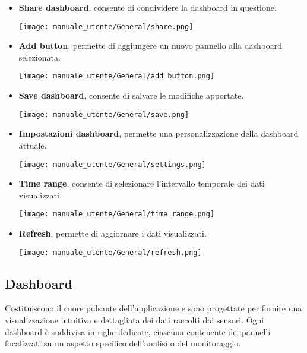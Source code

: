 \begin{itemize}
    \item \textbf{Share dashboard}, consente di condividere la dashboard in questione.
        \begin{center}
            \texttt{[image: manuale\_utente/General/share.png]}
        \end{center}
    \item \textbf{Add button}, permette di aggiungere un nuovo pannello alla dashboard selezionata.
        \begin{center}
            \texttt{[image: manuale\_utente/General/add\_button.png]}
        \end{center}
    \item \textbf{Save dashboard}, consente di salvare le modifiche apportate.
        \begin{center}
            \texttt{[image: manuale\_utente/General/save.png]}
        \end{center}
    \newpage
    \item \textbf{Impostazioni dashboard}, permette una personalizzazione della dashboard attuale.
        \begin{center}
            \texttt{[image: manuale\_utente/General/settings.png]}
        \end{center}
    \item \textbf{Time range}, consente di selezionare l'intervallo temporale dei dati visualizzati.
        \begin{center}
            \texttt{[image: manuale\_utente/General/time\_range.png]}
        \end{center}
    \item \textbf{Refresh}, permette di aggiornare i dati visualizzati.
        \begin{center}
            \texttt{[image: manuale\_utente/General/refresh.png]}
        \end{center}
\end{itemize}

\subsection{Dashboard}
Costituiscono il cuore pulsante dell'applicazione e sono progettate per fornire una visualizzazione intuitiva e dettagliata dei dati raccolti dai sensori. Ogni dashboard è suddivisa in righe dedicate, ciascuna contenente dei pannelli focalizzati su un aspetto specifico dell'analisi o del monitoraggio.

